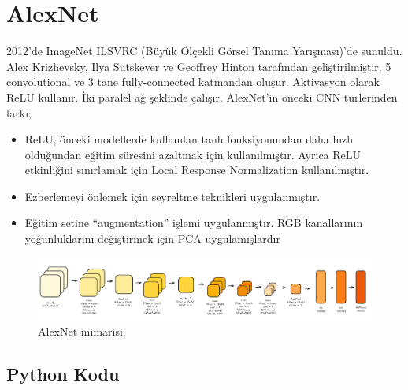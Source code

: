 \section{AlexNet}
2012'de ImageNet ILSVRC (Büyük Ölçekli Görsel Tanıma Yarışması)'de sunuldu. Alex Krizhevsky, Ilya Sutskever ve Geoffrey Hinton tarafından geliştirilmiştir. 5 convolutional ve 3 tane fully-connected katmandan oluşur. Aktivasyon olarak ReLU kullanır. İki paralel ağ şeklinde çalışır. AlexNet'in önceki CNN türlerinden farkı;

\begin{itemize}
    \item ReLU, önceki modellerde kullanılan tanh fonksiyonundan daha hızlı olduğundan eğitim süresini azaltmak için kullanılmıştır. Ayrıca ReLU etkinliğini sınırlamak için Local Response Normalization kullanılmıştır.
    \item Ezberlemeyi önlemek için seyreltme teknikleri uygulanmıştır.
    \item Eğitim setine “augmentation” işlemi uygulanmıştır. RGB kanallarının yoğunluklarını değiştirmek için PCA uygulamışlardır
\end{itemize}

\begin{figure}[h]
    \centering
    \includegraphics[width=1\textwidth]{images/alexnet.png}
    \caption{AlexNet mimarisi.}
    \label{fig:enter-label}
\end{figure}

\subsection{Python Kodu}


